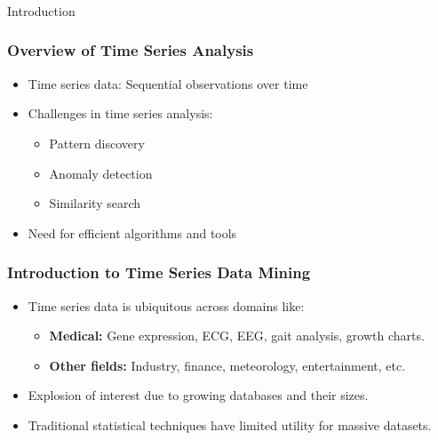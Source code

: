 \begin{frame}[fragile]\frametitle{}
\begin{center}
{\Large Introduction}
\end{center}
\end{frame}

\begin{frame}[fragile]\frametitle{Overview of Time Series Analysis}
    \begin{itemize}
        \item Time series data: Sequential observations over time
        \item Challenges in time series analysis:
            \begin{itemize}
                \item Pattern discovery
                \item Anomaly detection
                \item Similarity search
            \end{itemize}
        \item Need for efficient algorithms and tools
    \end{itemize}
\end{frame}

\begin{frame}[fragile]\frametitle{Introduction to Time Series Data Mining}
    \begin{itemize}
        \item Time series data is ubiquitous across domains like:
            \begin{itemize}
                \item \textbf{Medical:} Gene expression, ECG, EEG, gait analysis, growth charts.
                \item \textbf{Other fields:} Industry, finance, meteorology, entertainment, etc.
            \end{itemize}
        \item Explosion of interest due to growing databases and their sizes.
        \item Traditional statistical techniques have limited utility for massive datasets.
    \end{itemize}
\end{frame}

